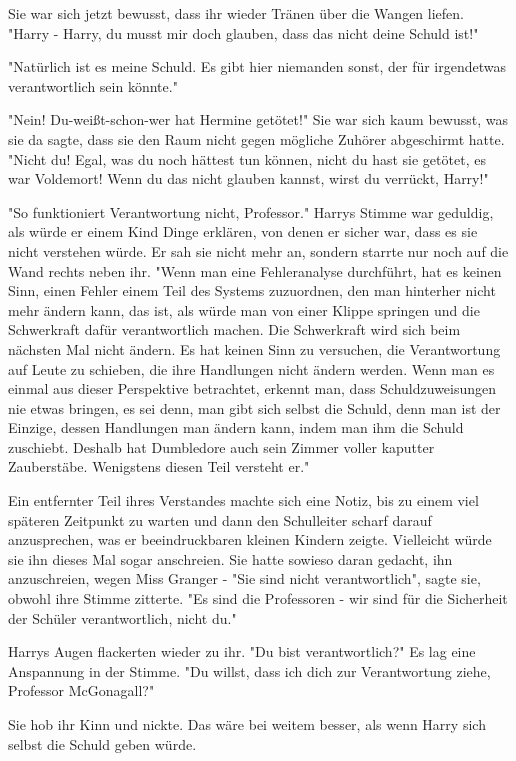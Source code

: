 {Sie war sich jetzt bewusst, dass ihr wieder Tränen über die Wangen liefen.\\ "Harry - Harry, du musst mir doch glauben, dass das nicht deine Schuld ist!"

"Natürlich ist es meine Schuld. Es gibt hier niemanden sonst, der für irgendetwas verantwortlich sein könnte."

"Nein! Du-weißt-schon-wer hat Hermine getötet!" Sie war sich kaum bewusst, was sie da sagte, dass sie den Raum nicht gegen mögliche Zuhörer abgeschirmt hatte. "Nicht du! Egal, was du noch hättest tun können, nicht du hast sie getötet, es war Voldemort! Wenn du das nicht glauben kannst, wirst du verrückt, Harry!"

"So funktioniert Verantwortung nicht, Professor." Harrys Stimme war geduldig, als würde er einem Kind Dinge erklären, von denen er sicher war, dass es sie nicht verstehen würde. Er sah sie nicht mehr an, sondern starrte nur noch auf die Wand rechts neben ihr. "Wenn man eine Fehleranalyse durchführt, hat es keinen Sinn, einen Fehler einem Teil des Systems zuzuordnen, den man hinterher nicht mehr ändern kann, das ist, als würde man von einer Klippe springen und die Schwerkraft dafür verantwortlich machen. Die Schwerkraft wird sich beim nächsten Mal nicht ändern. Es hat keinen Sinn zu versuchen, die Verantwortung auf Leute zu schieben, die ihre Handlungen nicht ändern werden. Wenn man es einmal aus dieser Perspektive betrachtet, erkennt man, dass Schuldzuweisungen nie etwas bringen, es sei denn, man gibt sich selbst die Schuld, denn man ist der Einzige, dessen Handlungen man ändern kann, indem man ihm die Schuld zuschiebt. Deshalb hat Dumbledore auch sein Zimmer voller kaputter Zauberstäbe. Wenigstens diesen Teil versteht er."

Ein entfernter Teil ihres Verstandes machte sich eine Notiz, bis zu einem viel späteren Zeitpunkt zu warten und dann den Schulleiter scharf darauf anzusprechen, was er beeindruckbaren kleinen Kindern zeigte. Vielleicht würde sie ihn dieses Mal sogar anschreien. Sie hatte sowieso daran gedacht, ihn anzuschreien, wegen Miss Granger - "Sie sind nicht verantwortlich", sagte sie, obwohl ihre Stimme zitterte. "Es sind die Professoren - wir sind für die Sicherheit der Schüler verantwortlich, nicht du."

Harrys Augen flackerten wieder zu ihr. "Du bist verantwortlich?" Es lag eine Anspannung in der Stimme. "Du willst, dass ich dich zur Verantwortung ziehe, Professor McGonagall?"

Sie hob ihr Kinn und nickte. Das wäre bei weitem besser, als wenn Harry sich selbst die Schuld geben würde.

}
